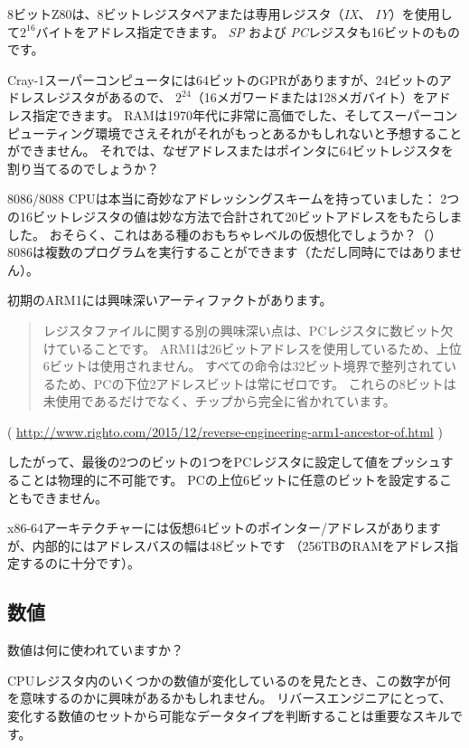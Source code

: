 8ビットZ80は、8ビットレジスタペアまたは専用レジスタ（\emph{IX}、 \emph{IY}）を使用して$2^{16}$バイトをアドレス指定できます。 
\emph{SP} および \emph{PC}レジスタも16ビットのものです。

Cray-1スーパーコンピュータには64ビットのGPRがありますが、24ビットのアドレスレジスタがあるので、
$2^{24}$（16メガワードまたは128メガバイト）をアドレス指定できます。 
RAMは1970年代に非常に高価でした、そしてスーパーコンピューティング環境でさえそれがそれがもっとあるかもしれないと予想することができません。 
それでは、なぜアドレスまたはポインタに64ビットレジスタを割り当てるのでしょうか？

8086/8088 CPUは本当に奇妙なアドレッシングスキームを持っていました：
2つの16ビットレジスタの値は妙な方法で合計されて20ビットアドレスをもたらしました。 
おそらく、これはある種のおもちゃレベルの仮想化でしょうか？（）
8086は複数のプログラムを実行することができます（ただし同時にではありません）。

初期のARM1には興味深いアーティファクトがあります。

\begin{framed}
\begin{quotation}
レジスタファイルに関する別の興味深い点は、PCレジスタに数ビット欠けていることです。 ARM1は26ビットアドレスを使用しているため、上位6ビットは使用されません。 すべての命令は32ビット境界で整列されているため、PCの下位2アドレスビットは常にゼロです。 これらの8ビットは未使用であるだけでなく、チップから完全に省かれています。
\end{quotation}
\end{framed}

( \url{http://www.righto.com/2015/12/reverse-engineering-arm1-ancestor-of.html} )

したがって、最後の2つのビットの1つをPCレジスタに設定して値をプッシュすることは物理的に不可能です。 
PCの上位6ビットに任意のビットを設定することもできません。

x86-64アーキテクチャーには仮想64ビットのポインター/アドレスがありますが、内部的にはアドレスバスの幅は48ビットです
（256TBの\ac{RAM}をアドレス指定するのに十分です）。

\subsection{数値}

数値は何に使われていますか？

CPUレジスタ内のいくつかの数値が変化しているのを見たとき、この数字が何を意味するのかに興味があるかもしれません。
リバースエンジニアにとって、変化する数値のセットから可能なデータタイプを判断することは重要なスキルです。

